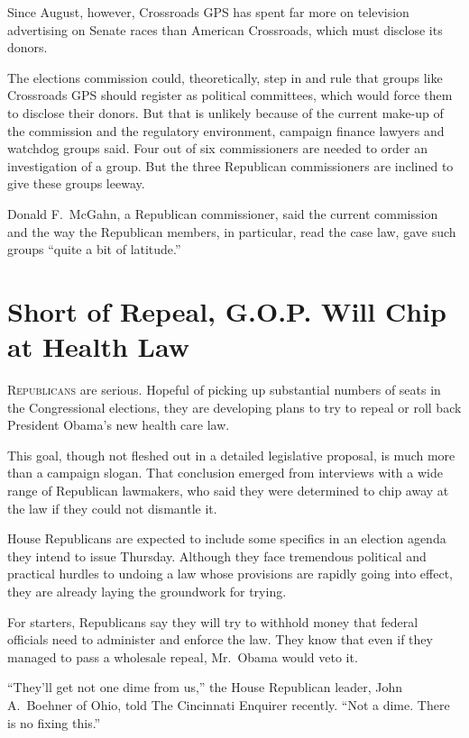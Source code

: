 ﻿\documentclass[12pt]{article}
\begin{document}
Since August, however, Crossroads GPS has spent far more on television advertising on Senate races
than American Crossroads, which must disclose its donors.

The elections commission could, theoretically, step in and rule that groups like Crossroads GPS
should register as political committees, which would force them to disclose their donors. But that
is unlikely because of the current make-up of the commission and the regulatory environment,
campaign finance lawyers and watchdog groups said. Four out of six commissioners are needed to order
an investigation of a group. But the three Republican commissioners are inclined to give these
groups leeway.

Donald F.~McGahn, a Republican commissioner, said the current commission and the way the Republican
members, in particular, read the case law, gave such groups ``quite a bit of latitude.''

\pagebreak
\section{Short of Repeal, G.O.P. Will Chip at Health Law}

\lettrine{R}{epublicans} are serious. Hopeful of picking up substantial
numbers of seats in the Congressional elections, they are developing plans to try to repeal or roll
back President Obama's new health care law.

This goal, though not fleshed out in a detailed legislative proposal, is much more than a campaign
slogan. That conclusion emerged from interviews with a wide range of Republican lawmakers, who said
they were determined to chip away at the law if they could not dismantle it.

House Republicans are expected to include some specifics in an election agenda they intend to issue
Thursday. Although they face tremendous political and practical hurdles to undoing a law whose
provisions are rapidly going into effect, they are already laying the groundwork for trying.

For starters, Republicans say they will try to withhold money that federal officials need to
administer and enforce the law. They know that even if they managed to pass a wholesale repeal,
Mr.~Obama would veto it.

``They'll get not one dime from us,'' the House Republican leader, John A.~Boehner of Ohio, told The
Cincinnati Enquirer recently. ``Not a dime. There is no fixing this.''
\end{document}
